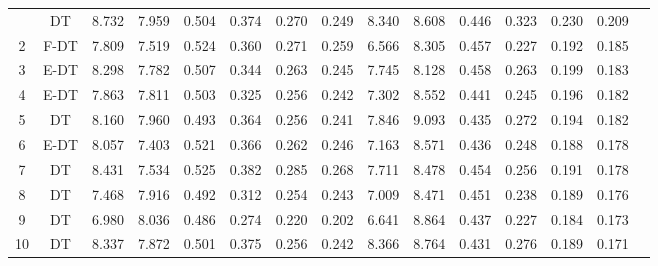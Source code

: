 \begin{longtable}{@{\hskip3pt}c@{\hskip3pt}c@{\hskip3pt}c@{\hskip3pt}c@{\hskip3pt}c@{\hskip3pt}c@{\hskip3pt}c@{\hskip3pt}c@{\hskip3pt}c@{\hskip3pt}c@{\hskip3pt}c@{\hskip3pt}c@{\hskip3pt}c@{\hskip3pt}c@{\hskip3pt}c}
\bottomrule
\endlastfoot
          1\label{tab:all-results-final} &             DT &             8.732 &       7.959 &         0.504 &       0.374 &       0.270 &        0.249 &               8.340 &       8.608 &         0.446 &       0.323 &       0.230 &        0.209 \\
          2 &           F-DT &             7.809 &       7.519 &         0.524 &       0.360 &       0.271 &        0.259 &               6.566 &       8.305 &         0.457 &       0.227 &       0.192 &        0.185 \\
          3 &           E-DT &             8.298 &       7.782 &         0.507 &       0.344 &       0.263 &        0.245 &               7.745 &       8.128 &         0.458 &       0.263 &       0.199 &        0.183 \\
          4 &           E-DT &             7.863 &       7.811 &         0.503 &       0.325 &       0.256 &        0.242 &               7.302 &       8.552 &         0.441 &       0.245 &       0.196 &        0.182 \\
          5 &             DT &             8.160 &       7.960 &         0.493 &       0.364 &       0.256 &        0.241 &               7.846 &       9.093 &         0.435 &       0.272 &       0.194 &        0.182 \\
          6 &           E-DT &             8.057 &       7.403 &         0.521 &       0.366 &       0.262 &        0.246 &               7.163 &       8.571 &         0.436 &       0.248 &       0.188 &        0.178 \\
          7 &             DT &             8.431 &       7.534 &         0.525 &       0.382 &       0.285 &        0.268 &               7.711 &       8.478 &         0.454 &       0.256 &       0.191 &        0.178 \\
          8 &             DT &             7.468 &       7.916 &         0.492 &       0.312 &       0.254 &        0.243 &               7.009 &       8.471 &         0.451 &       0.238 &       0.189 &        0.176 \\
          9 &             DT &             6.980 &       8.036 &         0.486 &       0.274 &       0.220 &        0.202 &               6.641 &       8.864 &         0.437 &       0.227 &       0.184 &        0.173 \\
         10 &             DT &             8.337 &       7.872 &         0.501 &       0.375 &       0.256 &        0.242 &               8.366 &       8.764 &         0.431 &       0.276 &       0.189 &        0.171 \\

\end{longtable}
